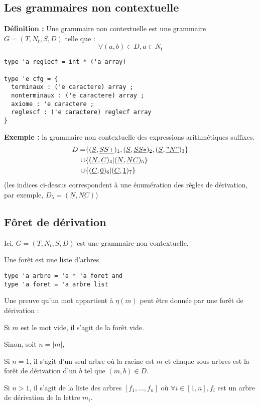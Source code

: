 \documentclass[a4paper,12pt]{article}
\newcommand{\norm}[1]{\lvert #1 \rvert}
\newlength{\mydepth}
\newlength{\myheight}
\newenvironment{answer}
{\par\begin{lrbox}{\mybox}\quad\begin{minipage}{\linewidth}\color{black}\setlength{\parskip}{10pt plus 1pt minus 1pt}\vspace*{-.7\baselineskip}}
{\end{minipage}\end{lrbox}
\settodepth{\mydepth}{\usebox{\mybox}}
\settoheight{\myheight}{\usebox{\mybox}}
\addtolength{\myheight}{\mydepth}
\noindent\makebox[0pt]{
  \color{gray}\hspace{-0pt}\rule[-\mydepth]{1pt}{\myheight}}
  \usebox{\mybox}
  }
\begin{document}
\subsection{Les grammaires non contextuelle}

\textbf{  Définition : } Une grammaire non contextuelle est une grammaire $G = (T,N_t,S,D)$ telle que :
\begin{equation*} \forall (a,b) \in D, a \in N_t  \end{equation*}


\begin{verbatim}
type 'a reglecf = int * ('a array)

type 'e cfg = {
  terminaux : ('e caractere) array ;
  nonterminaux : ('e caractere) array ;
  axiome : 'e caractere ;
  reglescf : ('e caractere) reglecf array
}
\end{verbatim}

\textbf{ Exemple : } la grammaire non contextuelle des expressions arithmétiques suffixes.
\begin{align*}
D = &\{(\underline{ S },\underline{ SS+ })_1,(\underline{ S },\underline{ SS* })_2,(\underline{ S },\underline{ "N" })_3\}\\
\cup&\{(\underline{ N },\underline{ C })_4 | (\underline{ N },\underline{ NC })_5\}\\
\cup&\{(\underline{ C },\underline{ 0 })_6 | (\underline{ C },\underline{  1 })_7\}
\end{align*}
(les indices ci-dessus correspondent à une énumération des règles de dérivation, par exemple, $D_5 = (\underline{ N },\underline{ NC })$)

\subsection{Fôret de dérivation}

Ici, $G = (T,N_t,S,D)$ est une grammaire non contextuelle.

Une forêt est une liste d'arbres
\begin{verbatim}
type 'a arbre = 'a * 'a foret and
type 'a foret = 'a arbre list
\end{verbatim}


Une preuve qu'un mot appartient à $\eta(m)$ peut être donnée par une forêt de dérivation :

\begin{answer} 
Si $m$ est le mot vide, il s'agit de la forêt vide.

Sinon, soit $n = \norm{m}$,\\
\begin{answer} 
    Si $n=1$, il s'agit d'un seul arbre où la racine est $m$ et chaque sous arbres est la forêt de dérivation d'un $b$ tel que $(m,b) \in D$.

    Si $n>1$, il s'agit de la liste des arbres $[f_1, \dots, f_n]$ où $\forall i \in [1,n], f_i$ est un arbre de dérivation de la lettre $m_i$.
\end{answer}
\end{answer}
\end{document}

